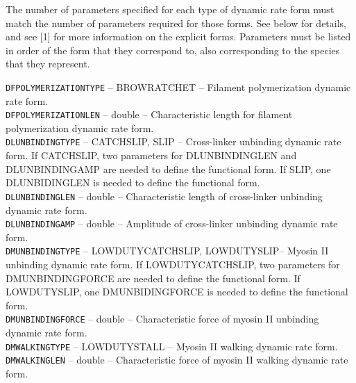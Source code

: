 \documentclass[11pt, oneside]{article}   	%
\begin{document}
\noindent The number of parameters specified for each type of dynamic rate form must match the number of parameters required for those forms. See below for details, and see [1] for more information on the explicit forms. Parameters must be listed in order of the form that they correspond to, also corresponding to the species that they represent.\\

\small

  \noindent\texttt{DFPOLYMERIZATIONTYPE} -- BROWRATCHET -- Filament polymerization dynamic rate form. \\
  
  \noindent\texttt{DFPOLYMERIZATIONLEN} -- double -- Characteristic length for filament polymerization dynamic rate form. \\
   
  \noindent\texttt{DLUNBINDINGTYPE} -- CATCHSLIP, SLIP -- Cross-linker unbinding dynamic rate form. 
  If CATCHSLIP, two
  parameters for DLUNBINDINGLEN and DLUNBINDINGAMP are needed to define the functional form. 
  If SLIP, one 
  DLUNBIDINGLEN is needed to define the functional form. \\
   
  \noindent\texttt{DLUNBINDINGLEN} -- double -- Characteristic length of cross-linker unbinding dynamic rate form. \\
   
   \noindent\texttt{DLUNBINDINGAMP} -- double -- Amplitude of cross-linker unbinding dynamic rate form. \\
   
   \noindent\texttt{DMUNBINDINGTYPE} -- LOWDUTYCATCHSLIP, LOWDUTYSLIP-- Myosin II unbinding dynamic rate form.
  If LOWDUTYCATCHSLIP, two
  parameters for DMUNBINDINGFORCE are needed to define the functional form. 
  If LOWDUTYSLIP, one 
  DMUNBIDINGFORCE is needed to define the functional form. \\
   
   \noindent\texttt{DMUNBINDINGFORCE} -- double -- Characteristic force of myosin II unbinding dynamic rate form. \\
   
   \noindent\texttt{DMWALKINGTYPE} -- LOWDUTYSTALL -- Myosin II walking dynamic rate form. \\ 
   
   \noindent\texttt{DMWALKINGLEN} -- double -- Characteristic force of myosin II walking dynamic rate form. \\
   
\end{document}
